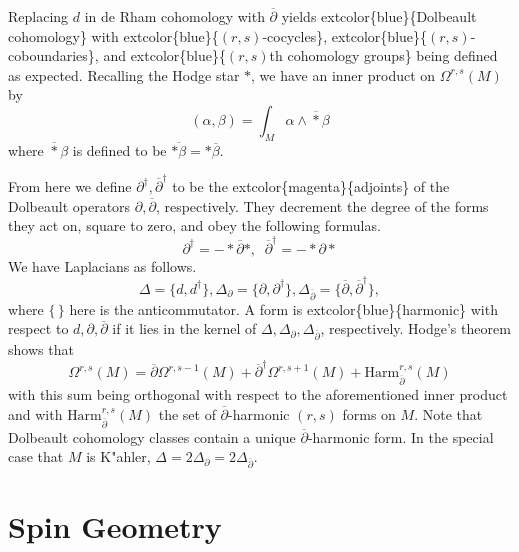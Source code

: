 \documentclass[
]{book}
\begin{document}
Replacing \(d\) in de Rham cohomology with \(\overline{\partial}\) yields extcolor\{blue\}\{Dolbeault cohomology\} with extcolor\{blue\}\{\((r,s)\)-cocycles\}, extcolor\{blue\}\{\((r,s)\)-coboundaries\}, and extcolor\{blue\}\{\((r,s)\)th cohomology groups\} being defined as expected. Recalling the Hodge star \(\ast\), we have an inner product on \(\Omega^{r,s}(M)\) by
\begin{equation} 
    (\alpha, \beta) = \int_M \alpha \wedge \overline{\ast} \beta
\end{equation}
where \(\overline{\ast} \beta\) is defined to be \(\overline{\ast\beta} = \ast \overline{\beta}\).

From here we define \(\partial^\dagger, \overline{\partial}^{\dagger}\) to be the extcolor\{magenta\}\{adjoints\} of the Dolbeault operators \(\partial, \overline{\partial}\), respectively.
They decrement the degree of the forms they act on, square to zero, and obey the following formulas.
\begin{equation}
    \partial^\dagger = - \ast \overline{\partial} \ast, \;\; \overline{\partial}^\dagger = - \ast \partial \ast 
\end{equation}
We have Laplacians as follows.
\begin{equation} 
    \Delta = \{d, d^\dagger\}, \Delta_\partial = \{\partial, \partial^\dagger\}, \Delta_{\overline{\partial}} = \{\overline{\partial}, \overline{\partial}^\dagger\},  
\end{equation}
where \(\{ \, \}\) here is the anticommutator. A form is extcolor\{blue\}\{harmonic\} with respect to \(d, \partial, \overline{\partial}\) if it lies in the kernel of \(\Delta, \Delta_\partial, \Delta_{\overline{\partial}}\), respectively. Hodge's theorem shows that
\begin{equation} 
    \Omega^{r,s}(M) = \overline{\partial} \Omega^{r,s-1}(M) + \overline{\partial}^\dagger \Omega^{r,s+1}(M) + \text{Harm}_{\overline{\partial}}^{r,s}(M) 
\end{equation}
with this sum being orthogonal with respect to the aforementioned inner product and with \(\text{Harm}_{\overline{\partial}}^{r,s}(M)\) the set of \(\overline{\partial}\)-harmonic \((r,s)\) forms on \(M\). Note that Dolbeault cohomology classes contain a unique \(\overline{\partial}\)-harmonic form.
In the special case that \(M\) is K"ahler, \(\Delta = 2\Delta_\partial = 2\Delta_{\overline{\partial}}\).

\hypertarget{spin-geometry}{%
\chapter{Spin Geometry}\label{spin-geometry}}
\end{document}
